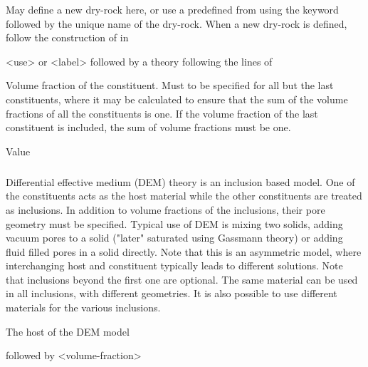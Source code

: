 {
 \slist
   \item \Description May define a new dry-rock here, or use a predefined  from  using the keyword  followed by the unique name of the dry-rock. When a new dry-rock is defined, follow the construction of  in 
   \item \Argument <use> or <label> followed by a theory following the lines of 
   \item \Default
 \elist

 \slist
   \item \Description Volume fraction of the constituent. Must to be specified for all but the last constituents, where it may be calculated to ensure that the sum of the volume fractions of all the constituents is one. If the volume fraction of the last constituent is included, the sum of volume fractions must be one. 
   \item \Argument Value
   \item \Default
 \elist

\subparagraph{}
 \slist
   \item \Description Differential effective medium (DEM) theory is an inclusion based model. One of the constituents acts as the host material while the other constituents are treated as inclusions. In addition to volume fractions of the inclusions, their pore geometry must be specified. Typical use of DEM is mixing two solids, adding vacuum pores to a solid ("later" saturated using Gassmann theory) or adding fluid filled pores in a solid directly. Note that this is an asymmetric model, where interchanging host and constituent typically leads to different solutions. Note that inclusions beyond the first one are optional. The same material can be used in all inclusions, with different geometries. It is also possible to use different materials for the various inclusions.
   \item \Argument
   \item \Default 
 \elist

 \slist
   \item \Description The host of the DEM model
   \item {} followed by <volume-fraction>
   \item \Default
 \elist

}
